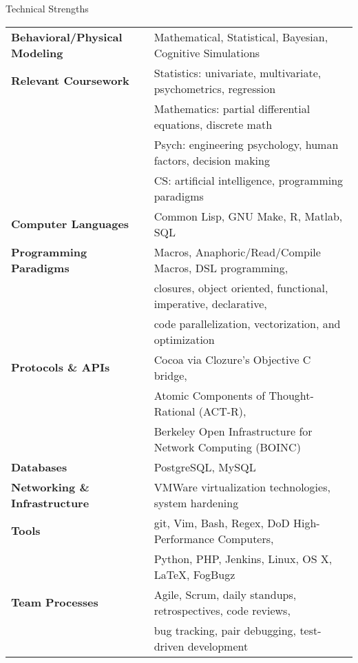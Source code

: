 

\begin{rSection}{Technical Strengths}
  \begin{tabular}{ @{} >{\bfseries}l @{\hspace{4ex}} l }
    Behavioral/Physical Modeling &	Mathematical, Statistical, Bayesian, Cognitive Simulations \\
    Relevant Coursework &		Statistics: univariate, multivariate, psychometrics, regression \\
    &					Mathematics: partial differential equations, discrete math \\
    &					Psych: engineering psychology, human factors, decision making \\ 
    &					CS: artificial intelligence, programming paradigms \\
    Computer Languages &		Common Lisp, GNU Make, R, Matlab, SQL \\
    Programming Paradigms &		Macros, Anaphoric/Read/Compile Macros, DSL programming, \\
    & 					closures, object oriented, functional, imperative, declarative, \\
    &					code parallelization, vectorization, and optimization \\
    Protocols \& APIs & 		Cocoa via Clozure's Objective C bridge, \\
    &					Atomic Components of Thought-Rational (ACT-R), \\
    &					Berkeley Open Infrastructure for Network Computing (BOINC) \\
    Databases &				PostgreSQL, MySQL \\
    Networking \& Infrastructure &	VMWare virtualization technologies, system hardening \\
    Tools & 				git, Vim, Bash, Regex, DoD High-Performance Computers, \\
    &					Python, PHP, Jenkins, Linux, OS X, \LaTeX, FogBugz \\
    Team Processes & 			Agile, Scrum, daily standups, retrospectives, code reviews, \\
    & 					bug tracking, pair debugging, test-driven development \\
  \end{tabular}
\end{rSection}

